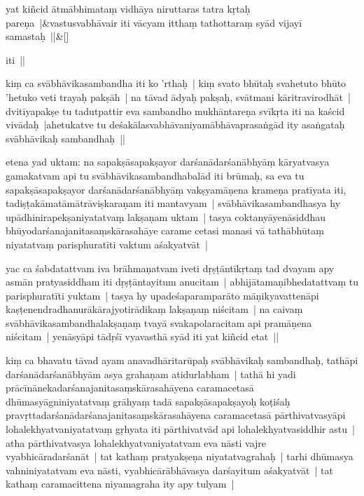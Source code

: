 \documentclass[article,a4paper]{memoir}
\newcommand{\add}[1]{($^{+}$#1)}
\newcommand{\deletion}[1]{($^{-}$#1)}
\begin{document}
	    
	    \stanza[\smallbreak]
yat kiñcid ā\-tmā\-bhimataṃ vidhā\-ya niruttaras tatra kṛtaḥ pareṇa |&vastusvabhā\-vair iti vā\-cyam itthaṃ tathottaraṃ syā\-d vijayī\- samastaḥ ||\&[\smallbreak]


	

	  \pstart iti ||
	\pend
      

	  \pstart kiṃ ca svā\-bhā\-vikasambandha iti ko 'rthaḥ | kiṃ svato bhū\-taḥ svahetuto bhū\-to 'hetuko veti trayaḥ pakṣā\-h | na tā\-vad ā\-dyaḥ pakṣaḥ, svā\-tmani kā\-ritravirodhā\-t | dvitī\-yapakṣe tu tadutpattir eva sambandho mukhā\-ntareṇa svī\-kṛta iti na kaścid vivā\-daḥ |ahetukatve tu deśakā\-lasvabhā\-vaniyamā\-bhā\-vaprasaṅgā\-d ity asaṅgataḥ svā\-bhā\-vikaḥ sambandhaḥ ||
	\pend
      

	  \pstart etena yad uktam: na sapakṣā\-sapakṣayor darśanā\-darśanā\-bhyā\-ṃ kā\-ryatvasya gamakatvam api tu svā\-bhā\-vikasambandhabalā\-d iti brū\-maḥ, sa eva tu sapakṣā\-sapakṣayor darśanā\-darśanā\-bhyā\-ṃ vakṣyamā\-ṇena krameṇa pratī\-yata iti, tadiṣṭakā\-matā\-mā\-trā\-viṣkaraṇam iti mantavyam | svā\-bhā\-vikasambandhasya hy upā\-dhinirapekṣaniyatatvaṃ lakṣaṇam uktam | tasya coktanyā\-yenā\-siddhau bhū\-yodarśanajanitasaṃskā\-rasahā\-ye carame cetasi manasi vā\- tathā\-bhū\-taṃ niyatatvaṃ parisphuratī\-ti \edtext{sahṛdayena}{\Afootnote{sa\deletion{ha}\add{hṛ}dayena \cite{}; sadayena \cite{}  {\rmlatinfont [App type: var]}}} vaktum aśakyatvā\-t |
	\pend
      

	  \pstart yac ca śabdatattvam iva brā\-hmaṇatvam iveti dṛṣṭā\-ntī\-kṛtaṃ tad dvayam apy asmā\-n pratyasiddham iti dṛṣṭā\-ntayitum anucitam | abhijā\-tamaṇibhedatattvaṃ tu parisphuratī\-ti yuktam | tasya hy upadeśaparamparā\-to mā\-ṇikyavattenā\-pi kaṣṭenendradhanurā\-kā\-rajyotirā\-dikaṃ lakṣaṇaṃ niścitam | na caivaṃ svā\-bhā\-vikasambandhalakṣaṇaṃ tvayā\- svakapolaracitam api pramā\-ṇena niścitam | yenā\-syā\-pi tā\-dṛśī\- vyavasthā\- syā\-d iti yat kiñcid etat ||
	\pend
      

	  \pstart kiṃ ca bhavatu tā\-vad ayam anavadhā\-ritarū\-paḥ svā\-bhā\-vikaḥ sambandhaḥ, tathā\-pi darśanā\-darśanā\-bhyā\-m asya grahaṇam atidurlabham | tathā\- hi yadi prā\-cī\-nā\-nekadarśanajanitasaṃskā\-rasahā\-yena caramacetasā\- dhū\-masyā\-gniniyatatvaṃ grā\-hyaṃ tadā\- sapakṣā\-sapakṣayoḥ koṭiśaḥ pravṛttadarśanā\-darśanajanitasaṃskā\-rasahā\-yena caramacetasā\- pā\-rthivatvasyā\-pi lohalekhyatvaniyatatvaṃ gṛhyata iti pā\-rthivatvā\-d api lohalekhyatvasiddhir astu | atha pā\-rthivatvasya lohalekhyatvaniyatatvam eva nā\-sti vajre vyabhicā\-radarśanā\-t | tat kathaṃ pratyakṣeṇa niyatatvagrahaḥ | tarhi dhū\-masya vahniniyatatvam eva nā\-sti, vyabhicā\-rā\-bhā\-vasya darśayitum aśakyatvā\-t | tat kathaṃ caramacittena niyamagraha ity apy tulyam |
	\pend
      
\end{document}
